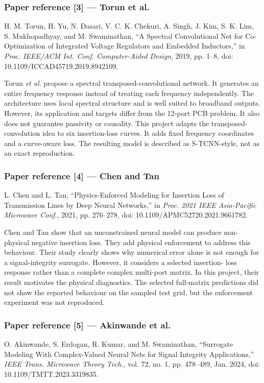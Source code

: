 \subsubsection*{Paper reference [3] --- Torun et al.}
H. M. Torun, H. Yu, N. Dasari, V. C. K. Chekuri, A. Singh, J. Kim, S. K. Lim,
S. Mukhopadhyay, and M. Swaminathan, ``A Spectral Convolutional Net for
Co-Optimization of Integrated Voltage Regulators and Embedded Inductors,'' in
\emph{Proc. IEEE/ACM Int. Conf. Computer-Aided Design}, 2019, pp. 1--8,
doi: 10.1109/ICCAD45719.2019.8942109.

Torun \textit{et al.} propose a spectral transposed-convolutional network. It
generates an entire frequency response instead of treating each frequency
independently. The architecture uses local spectral structure and is well
suited to broadband outputs. However, its application and targets differ from
the 12-port PCB problem. It also does not guarantee passivity or causality. This
project adapts the transposed-convolution idea to six insertion-loss curves. It
adds fixed frequency coordinates and a curve-aware loss. The resulting model is
described as S-TCNN-style, not as an exact reproduction.

\subsubsection*{Paper reference [4] --- Chen and Tan}
L. Chen and L. Tan, ``Physics-Enforced Modeling for Insertion Loss of
Transmission Lines by Deep Neural Networks,'' in \emph{Proc. 2021 IEEE
Asia-Pacific Microwave Conf.}, 2021, pp. 276--278,
doi: 10.1109/APMC52720.2021.9661782.

Chen and Tan show that an unconstrained neural model can produce non-physical
negative insertion loss. They add physical enforcement to address this
behaviour. Their study clearly shows why numerical error alone is not enough
for a signal-integrity surrogate. However, it considers a selected insertion-
loss response rather than a complete complex multi-port matrix. In this
project, their result motivates the physical diagnostics. The selected
full-matrix predictions did not show the reported behaviour on the sampled test
grid, but the enforcement experiment was not reproduced.

\subsubsection*{Paper reference [5] --- Akinwande et al.}
O. Akinwande, S. Erdogan, R. Kumar, and M. Swaminathan, ``Surrogate Modeling
With Complex-Valued Neural Nets for Signal Integrity Applications,''
\emph{IEEE Trans. Microwave Theory Tech.}, vol. 72, no. 1, pp. 478--489,
Jan. 2024, doi: 10.1109/TMTT.2023.3319835.

